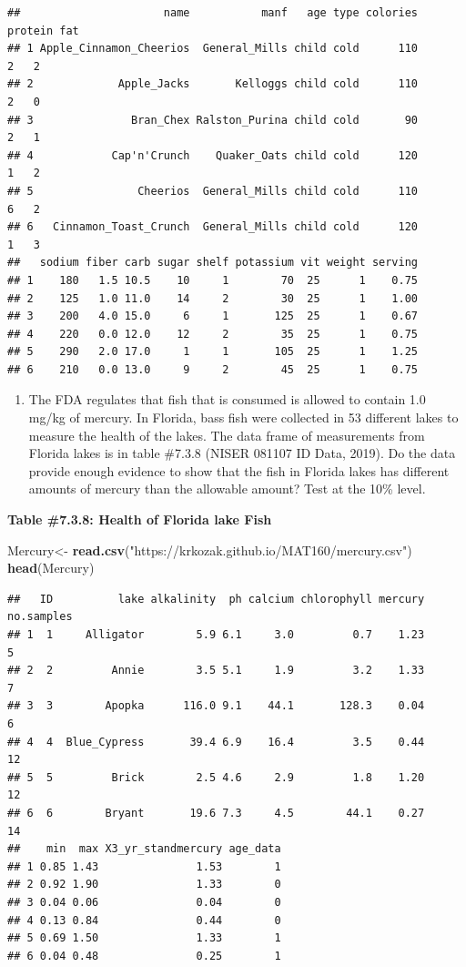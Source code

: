 \documentclass[]{book}
\newenvironment{Shaded}{\begin{snugshade}}{\end{snugshade}}
\newcommand{\KeywordTok}[1]{\textcolor[rgb]{0.13,0.29,0.53}{\textbf{#1}}}
\newcommand{\NormalTok}[1]{#1}
\newcommand{\StringTok}[1]{\textcolor[rgb]{0.31,0.60,0.02}{#1}}
\providecommand{\tightlist}{%
  \setlength{\itemsep}{0pt}\setlength{\parskip}{0pt}}
\begin{document}
\begin{verbatim}
##                      name           manf   age type colories protein fat
## 1 Apple_Cinnamon_Cheerios  General_Mills child cold      110       2   2
## 2             Apple_Jacks       Kelloggs child cold      110       2   0
## 3               Bran_Chex Ralston_Purina child cold       90       2   1
## 4            Cap'n'Crunch    Quaker_Oats child cold      120       1   2
## 5                Cheerios  General_Mills child cold      110       6   2
## 6   Cinnamon_Toast_Crunch  General_Mills child cold      120       1   3
##   sodium fiber carb sugar shelf potassium vit weight serving
## 1    180   1.5 10.5    10     1        70  25      1    0.75
## 2    125   1.0 11.0    14     2        30  25      1    1.00
## 3    200   4.0 15.0     6     1       125  25      1    0.67
## 4    220   0.0 12.0    12     2        35  25      1    0.75
## 5    290   2.0 17.0     1     1       105  25      1    1.25
## 6    210   0.0 13.0     9     2        45  25      1    0.75
\end{verbatim}

\begin{enumerate}
\def\labelenumi{\arabic{enumi}.}
\setcounter{enumi}{2}
\tightlist
\item
  The FDA regulates that fish that is consumed is allowed to contain 1.0 mg/kg of mercury. In Florida, bass fish were collected in 53 different lakes to measure the health of the lakes. The data frame of measurements from Florida lakes is in table \#7.3.8 (NISER 081107 ID Data, 2019). Do the data provide enough evidence to show that the fish in Florida lakes has different amounts of mercury than the allowable amount? Test at the 10\% level.
\end{enumerate}

\textbf{Table \#7.3.8: Health of Florida lake Fish}

\begin{Shaded}
\begin{Highlighting}[]
\NormalTok{Mercury<-}\StringTok{ }\KeywordTok{read.csv}\NormalTok{(}\StringTok{"https://krkozak.github.io/MAT160/mercury.csv"}\NormalTok{)}
\KeywordTok{head}\NormalTok{(Mercury)}
\end{Highlighting}
\end{Shaded}

\begin{verbatim}
##   ID          lake alkalinity  ph calcium chlorophyll mercury no.samples
## 1  1     Alligator        5.9 6.1     3.0         0.7    1.23          5
## 2  2         Annie        3.5 5.1     1.9         3.2    1.33          7
## 3  3        Apopka      116.0 9.1    44.1       128.3    0.04          6
## 4  4  Blue_Cypress       39.4 6.9    16.4         3.5    0.44         12
## 5  5         Brick        2.5 4.6     2.9         1.8    1.20         12
## 6  6        Bryant       19.6 7.3     4.5        44.1    0.27         14
##    min  max X3_yr_standmercury age_data
## 1 0.85 1.43               1.53        1
## 2 0.92 1.90               1.33        0
## 3 0.04 0.06               0.04        0
## 4 0.13 0.84               0.44        0
## 5 0.69 1.50               1.33        1
## 6 0.04 0.48               0.25        1
\end{verbatim}
\end{document}
